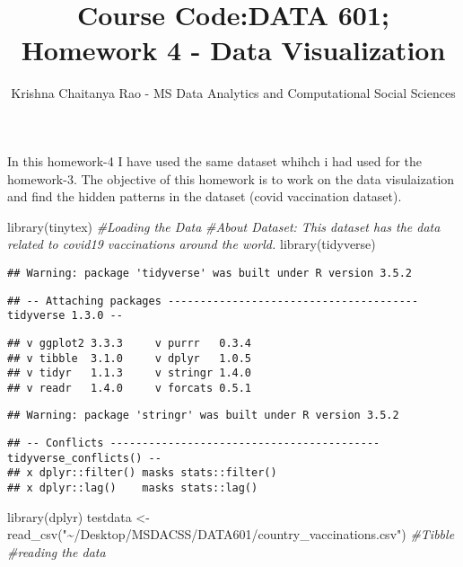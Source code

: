 \documentclass[
]{article}
\title{Course Code:DATA 601; Homework 4 - Data Visualization}
\author{Krishna Chaitanya Rao - MS Data Analytics and Computational
Social Sciences}
\date{}
\newenvironment{Shaded}{\begin{snugshade}}{\end{snugshade}}
\newcommand{\CommentTok}[1]{\textcolor[rgb]{0.56,0.35,0.01}{\textit{#1}}}
\newcommand{\FunctionTok}[1]{\textcolor[rgb]{0.00,0.00,0.00}{#1}}
\newcommand{\NormalTok}[1]{#1}
\newcommand{\OtherTok}[1]{\textcolor[rgb]{0.56,0.35,0.01}{#1}}
\newcommand{\StringTok}[1]{\textcolor[rgb]{0.31,0.60,0.02}{#1}}
\begin{document}
\maketitle

In this homework-4 I have used the same dataset whihch i had used for
the homework-3. The objective of this homework is to work on the data
visulaization and find the hidden patterns in the dataset (covid
vaccination dataset).

\begin{Shaded}
\begin{Highlighting}[]
\FunctionTok{library}\NormalTok{(tinytex)}
\CommentTok{\#Loading the Data}
\CommentTok{\#About Dataset: This dataset has the data related to covid19 vaccinations around the world.}
\FunctionTok{library}\NormalTok{(tidyverse)}
\end{Highlighting}
\end{Shaded}

\begin{verbatim}
## Warning: package 'tidyverse' was built under R version 3.5.2
\end{verbatim}

\begin{verbatim}
## -- Attaching packages --------------------------------------- tidyverse 1.3.0 --
\end{verbatim}

\begin{verbatim}
## v ggplot2 3.3.3     v purrr   0.3.4
## v tibble  3.1.0     v dplyr   1.0.5
## v tidyr   1.1.3     v stringr 1.4.0
## v readr   1.4.0     v forcats 0.5.1
\end{verbatim}

\begin{verbatim}
## Warning: package 'stringr' was built under R version 3.5.2
\end{verbatim}

\begin{verbatim}
## -- Conflicts ------------------------------------------ tidyverse_conflicts() --
## x dplyr::filter() masks stats::filter()
## x dplyr::lag()    masks stats::lag()
\end{verbatim}

\begin{Shaded}
\begin{Highlighting}[]
\FunctionTok{library}\NormalTok{(dplyr)}
\NormalTok{testdata }\OtherTok{\textless{}{-}}  \FunctionTok{read\_csv}\NormalTok{(}\StringTok{"\textasciitilde{}/Desktop/MSDACSS/DATA601/country\_vaccinations.csv"}\NormalTok{) }\CommentTok{\#Tibble \#reading the data}
\end{Highlighting}
\end{Shaded}
\end{document}
